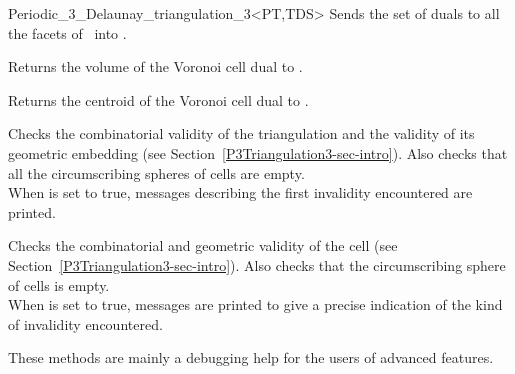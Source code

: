 \begin{ccRefClass}{Periodic_3_Delaunay_triangulation_3<PT,TDS>}
{Sends the set of duals to all the facets of \ccVar\ into .}

{Returns the volume of the Voronoi cell dual to .}

{Returns the centroid of the Voronoi cell dual to .}

\begin{ccAdvanced}
{Checks the combinatorial validity of the triangulation and the
validity of its geometric embedding (see
Section~\ref{P3Triangulation3-sec-intro}). Also checks that all the
circumscribing spheres of cells are empty.\\
When  is set to true,  messages describing the first
invalidity encountered are printed.}

{Checks the combinatorial and geometric validity of the cell (see
Section~\ref{P3Triangulation3-sec-intro}). Also checks that the
circumscribing sphere of cells is empty.\\
When  is set to true, messages are printed to give
a precise indication of the kind of invalidity encountered.}

These methods are  mainly a debugging help for the users of advanced features.
\end{ccAdvanced}

\ccSeeAlso




\end{ccRefClass}
